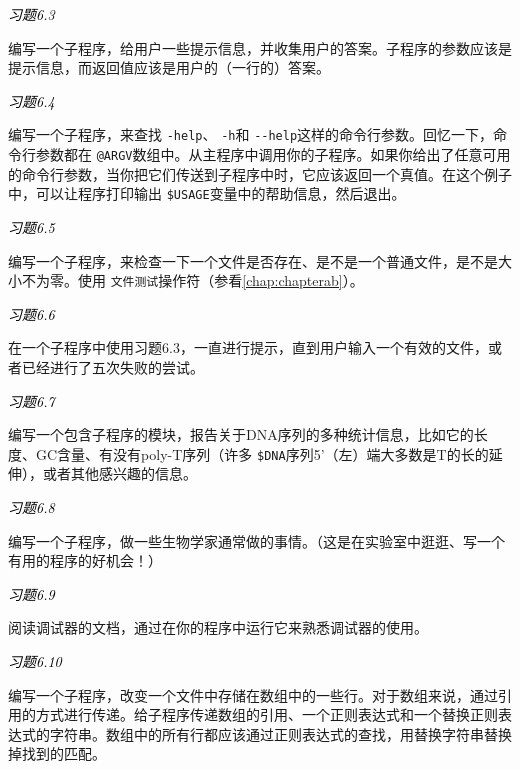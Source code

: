 \textcolor{black}{\textit{习题6.3}}
\begin{adjustwidth}{4em}{}
编写一个子程序，给用户一些提示信息，并收集用户的答案。子程序的参数应该是提示信息，而返回值应该是用户的（一行的）答案。
\end{adjustwidth}

\textcolor{black}{\textit{习题6.4}}
\begin{adjustwidth}{4em}{}
编写一个子程序，来查找 \verb|-help|、 \verb|-h|和 \verb|--help|这样的命令行参数。回忆一下，命令行参数都在 \verb|@ARGV|数组中。从主程序中调用你的子程序。如果你给出了任意可用的命令行参数，当你把它们传送到子程序中时，它应该返回一个真值。在这个例子中，可以让程序打印输出 \verb|$USAGE|变量中的帮助信息，然后退出。
\end{adjustwidth}

\textcolor{black}{\textit{习题6.5}}
\begin{adjustwidth}{4em}{}
编写一个子程序，来检查一下一个文件是否存在、是不是一个普通文件，是不是大小不为零。使用 \verb|文件测试|操作符（参看\autoref{chap:chapterab}）。
\end{adjustwidth}

\textcolor{black}{\textit{习题6.6}}
\begin{adjustwidth}{4em}{}
在一个子程序中使用习题6.3，一直进行提示，直到用户输入一个有效的文件，或者已经进行了五次失败的尝试。
\end{adjustwidth}

\textcolor{black}{\textit{习题6.7}}
\begin{adjustwidth}{4em}{}
编写一个包含子程序的模块，报告关于DNA序列的多种统计信息，比如它的长度、GC含量、有没有poly-T序列（许多 \verb|$DNA|序列5'（左）端大多数是T的长的延伸），或者其他感兴趣的信息。
\end{adjustwidth}

\textcolor{black}{\textit{习题6.8}}
\begin{adjustwidth}{4em}{}
编写一个子程序，做一些生物学家通常做的事情。（这是在实验室中逛逛、写一个有用的程序的好机会！）
\end{adjustwidth}

\textcolor{black}{\textit{习题6.9}}
\begin{adjustwidth}{4em}{}
阅读调试器的文档，通过在你的程序中运行它来熟悉调试器的使用。
\end{adjustwidth}

\textcolor{black}{\textit{习题6.10}}
\begin{adjustwidth}{4em}{}
编写一个子程序，改变一个文件中存储在数组中的一些行。对于数组来说，通过引用的方式进行传递。给子程序传递数组的引用、一个正则表达式和一个替换正则表达式的字符串。数组中的所有行都应该通过正则表达式的查找，用替换字符串替换掉找到的匹配。
\end{adjustwidth}
